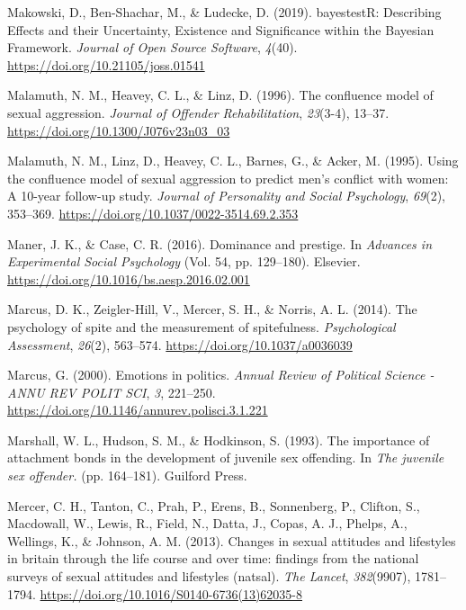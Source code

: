 \documentclass[
  donotrepeattitle,doc, 12pt, a4paper,floatsintext]{apa7}
\newlength{\cslhangindent}
\newlength{\cslentryspacingunit} %
\newenvironment{CSLReferences}[2] %
 {%
  \setlength{\parindent}{0pt}
  \ifodd #1
  \let\oldpar\par
  \def\par{\hangindent=\cslhangindent\oldpar}
  \fi
  \setlength{\parskip}{#2\cslentryspacingunit}
 }%
 {}
\begin{document}
\begin{CSLReferences}{1}{0}
\leavevmode{}%
Makowski, D., Ben-Shachar, M., \& Ludecke, D. (2019). bayestestR: Describing Effects and their Uncertainty, Existence and Significance within the Bayesian Framework. \emph{Journal of Open Source Software}, \emph{4}(40). \url{https://doi.org/10.21105/joss.01541}

\leavevmode{}%
Malamuth, N. M., Heavey, C. L., \& Linz, D. (1996). The confluence model of sexual aggression. \emph{Journal of Offender Rehabilitation}, \emph{23}(3-4), 13--37. \url{https://doi.org/10.1300/J076v23n03_03}

\leavevmode{}%
Malamuth, N. M., Linz, D., Heavey, C. L., Barnes, G., \& Acker, M. (1995). Using the confluence model of sexual aggression to predict men's conflict with women: A 10-year follow-up study. \emph{Journal of Personality and Social Psychology}, \emph{69}(2), 353--369. \url{https://doi.org/10.1037/0022-3514.69.2.353}

\leavevmode{}%
Maner, J. K., \& Case, C. R. (2016). Dominance and prestige. In \emph{Advances in Experimental Social Psychology} (Vol. 54, pp. 129--180). Elsevier. \url{https://doi.org/10.1016/bs.aesp.2016.02.001}

\leavevmode{}%
Marcus, D. K., Zeigler-Hill, V., Mercer, S. H., \& Norris, A. L. (2014). The psychology of spite and the measurement of spitefulness. \emph{Psychological Assessment}, \emph{26}(2), 563--574. \url{https://doi.org/10.1037/a0036039}

\leavevmode{}%
Marcus, G. (2000). Emotions in politics. \emph{Annual Review of Political Science - ANNU REV POLIT SCI}, \emph{3}, 221--250. \url{https://doi.org/10.1146/annurev.polisci.3.1.221}

\leavevmode{}%
Marshall, W. L., Hudson, S. M., \& Hodkinson, S. (1993). The importance of attachment bonds in the development of juvenile sex offending. In \emph{The juvenile sex offender.} (pp. 164--181). Guilford Press.

\leavevmode{}%
Mercer, C. H., Tanton, C., Prah, P., Erens, B., Sonnenberg, P., Clifton, S., Macdowall, W., Lewis, R., Field, N., Datta, J., Copas, A. J., Phelps, A., Wellings, K., \& Johnson, A. M. (2013). Changes in sexual attitudes and lifestyles in britain through the life course and over time: findings from the national surveys of sexual attitudes and lifestyles (natsal). \emph{The Lancet}, \emph{382}(9907), 1781--1794. \url{https://doi.org/10.1016/S0140-6736(13)62035-8}


\end{CSLReferences}
\end{document}

